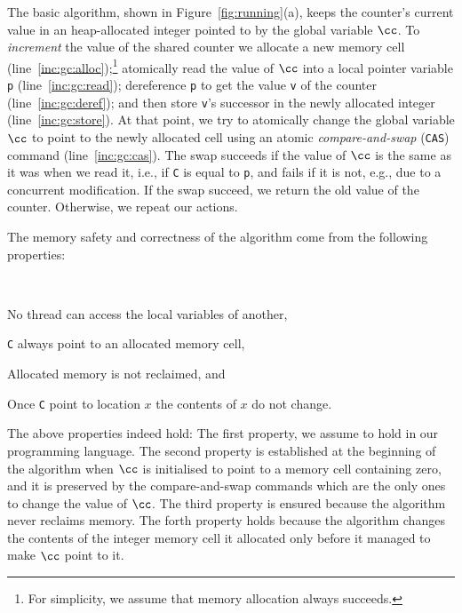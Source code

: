 The basic algorithm, shown in Figure~\ref{fig:running}(a), 
keeps the counter's current value in an heap-allocated   
integer pointed to by the global variable $\cc$.
To  \emph{increment} the value of the shared counter 
we allocate a new memory cell 
(line~\ref{inc:gc:alloc});\footnote{\label{fn:alloc}For simplicity, we assume that memory allocation always succeeds.}
atomically read  the value of $\cc$ into a local pointer variable \texttt{p} (line~\ref{inc:gc:read});
dereference \texttt{p}  to get the value \texttt{v} 
of the counter (line~\ref{inc:gc:deref});
and then store \texttt{v}'s successor in the newly allocated integer (line~\ref{inc:gc:store}).
At that point, we try to atomically change the global variable $\cc$ to point to the newly allocated cell using 
an atomic \emph{compare-and-swap} (\texttt{CAS}) command (line~\ref{inc:gc:cas}).
The swap succeeds if the value of $\cc$ is the same as it was when we read it, i.e., if \texttt{C} is 
equal to \texttt{p}, 
and fails if it is not, e.g., due to a concurrent modification.
If the swap succeed, we return the old value of the counter.
Otherwise, we repeat our actions. 

The memory safety and correctness of the algorithm come from the following properties:
\begin{property}\label{prop:simple:mem} ~ 
  
\begin{compactenum}  
\item \label{prop:inc:locals}
No thread can  access the local variables of another,
\item \label{prop:inc:cnn}
\texttt{C} always point to an allocated memory cell, 
\item \label{prop:inc:nfree}
Allocated memory is not reclaimed, and
\item \label{prop:inc:val}
Once \texttt{C} point to location $x$ the contents of $x$ do not change. %
\end{compactenum}
\end{property}

The above properties indeed hold:
The first property, we assume to hold in our programming language.
The second property is established 
at the beginning of the algorithm when $\cc$ is initialised to point to a memory 
cell containing zero, and it is preserved by the compare-and-swap  commands which 
are the only ones to change the value of $\cc$.
The third property is ensured because the algorithm  never  reclaims memory.
The forth property holds because the algorithm changes the contents of the integer memory 
cell it allocated only before it managed to make $\cc$ point to it.

